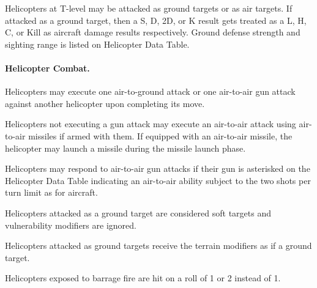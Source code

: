 {Helicopters at T-level may be attacked as ground targets or as air targets.  If attacked as a ground target, then a S, D, 2D, or K result gets treated as a L, H, C, or Kill as aircraft damage results respectively.  Ground defense strength and sighting range is listed on Helicopter Data Table.

\paragraph{Helicopter Combat.}

Helicopters may execute one air-to-ground attack or one air-to-air gun attack against another helicopter upon completing its move.

Helicopters not executing a gun attack may execute an air-to-air attack using air-to-air missiles if armed with them.  If equipped with an air-to-air missile, the helicopter may launch a missile during the missile launch phase.

Helicopters may respond to air-to-air gun attacks if their gun is asterisked on the Helicopter Data Table indicating an air-to-air ability subject to the two shots per turn limit as for aircraft.

Helicopters attacked as a ground target are considered soft targets and vulnerability modifiers are ignored.

Helicopters attacked as ground targets receive the terrain modifiers as if a ground target.

Helicopters exposed to barrage fire are hit on a roll of 1 or 2 instead of 1.

}
